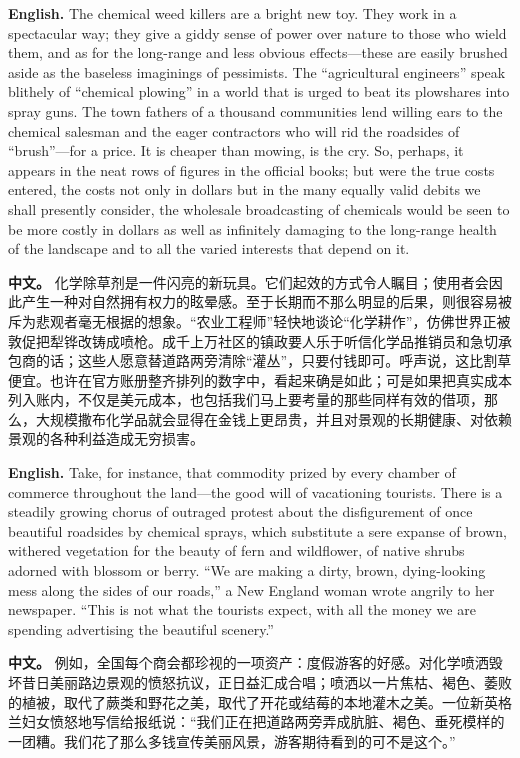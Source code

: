 \noindent\textbf{English.} The chemical weed killers are a bright new toy. They work in a spectacular way; they give a giddy sense of power over nature to those who wield them, and as for the long-range and less obvious effects---these are easily brushed aside as the baseless imaginings of pessimists. The ``agricultural engineers'' speak blithely of ``chemical plowing'' in a world that is urged to beat its plowshares into spray guns. The town fathers of a thousand communities lend willing ears to the chemical salesman and the eager contractors who will rid the roadsides of ``brush''---for a price. It is cheaper than mowing, is the cry. So, perhaps, it appears in the neat rows of figures in the official books; but were the true costs entered, the costs not only in dollars but in the many equally valid debits we shall presently consider, the wholesale broadcasting of chemicals would be seen to be more costly in dollars as well as infinitely damaging to the long-range health of the landscape and to all the varied interests that depend on it.
\par
\noindent\textbf{中文。} 化学除草剂是一件闪亮的新玩具。它们起效的方式令人瞩目；使用者会因此产生一种对自然拥有权力的眩晕感。至于长期而不那么明显的后果，则很容易被斥为悲观者毫无根据的想象。“农业工程师”轻快地谈论“化学耕作”，仿佛世界正被敦促把犁铧改铸成喷枪。成千上万社区的镇政要人乐于听信化学品推销员和急切承包商的话；这些人愿意替道路两旁清除“灌丛”，只要付钱即可。呼声说，这比割草便宜。也许在官方账册整齐排列的数字中，看起来确是如此；可是如果把真实成本列入账内，不仅是美元成本，也包括我们马上要考量的那些同样有效的借项，那么，大规模撒布化学品就会显得在金钱上更昂贵，并且对景观的长期健康、对依赖景观的各种利益造成无穷损害。
\par\medskip

\noindent\textbf{English.} Take, for instance, that commodity prized by every chamber of commerce throughout the land---the good will of vacationing tourists. There is a steadily growing chorus of outraged protest about the disfigurement of once beautiful roadsides by chemical sprays, which substitute a sere expanse of brown, withered vegetation for the beauty of fern and wildflower, of native shrubs adorned with blossom or berry. ``We are making a dirty, brown, dying-looking mess along the sides of our roads,'' a New England woman wrote angrily to her newspaper. ``This is not what the tourists expect, with all the money we are spending advertising the beautiful scenery.''
\par
\noindent\textbf{中文。} 例如，全国每个商会都珍视的一项资产：度假游客的好感。对化学喷洒毁坏昔日美丽路边景观的愤怒抗议，正日益汇成合唱；喷洒以一片焦枯、褐色、萎败的植被，取代了蕨类和野花之美，取代了开花或结莓的本地灌木之美。一位新英格兰妇女愤怒地写信给报纸说：“我们正在把道路两旁弄成肮脏、褐色、垂死模样的一团糟。我们花了那么多钱宣传美丽风景，游客期待看到的可不是这个。”
\par\medskip

